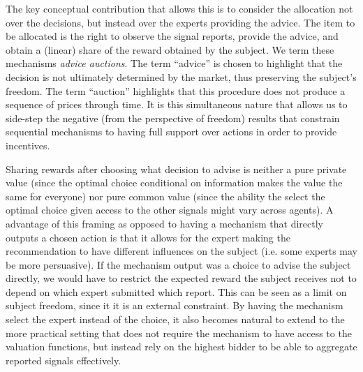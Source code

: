 


The key conceptual contribution that allows this is to consider the allocation not over the decisions, but instead over the experts providing the advice. 
The item to be allocated is the right to observe the signal reports, provide the advice, and obtain a (linear) share of the reward obtained by the subject.
We term these mechanisms \emph{advice auctions}.
The term ``advice'' is chosen to highlight that the decision is not ultimately determined by the market, thus preserving the subject's freedom.
The term ``auction'' highlights that this procedure does not produce a sequence of prices through time.
It is this simultaneous nature that allows us to side-step the negative (from the perspective of freedom) results that constrain sequential mechanisms to having full support over actions in order to provide  incentives.

Sharing rewards after choosing what decision to advise is neither a pure private value (since the optimal choice conditional on information makes the value the same for everyone) nor pure common value (since the ability the select the optimal choice given access to the other signals might vary across agents).
A advantage of this framing as opposed to having a mechanism that directly outputs a chosen action is that it allows for the expert making the recommendation to have different influences on the subject (i.e. some experts may be more persuasive).
If the mechanism output was a choice to advise the subject directly, we would have to restrict the expected reward the subject receives not to depend on which expert submitted which report. This can be seen as  a limit on subject freedom, since it it is an external constraint.
By having the mechanism select the expert instead of the choice, it also becomes natural to extend to the more practical setting that does not require the mechanism to have access to the valuation functions, but instead rely on the highest bidder to be able to aggregate reported signals effectively.



